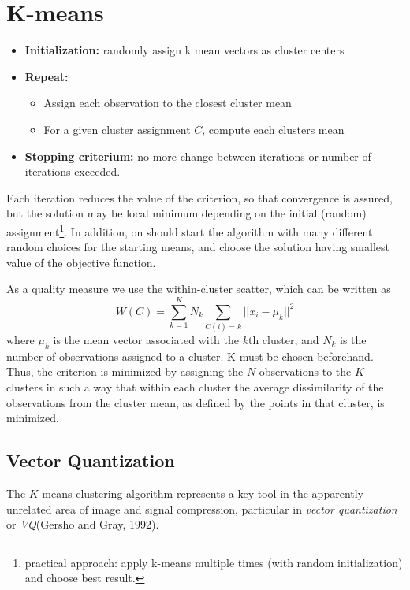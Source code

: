 
\section*{K-means}

\begin{itemize}
	\item \textbf{Initialization:} randomly assign k mean vectors as cluster centers
	\item \textbf{Repeat:}
		\begin{itemize}
			\item Assign each observation to the closest cluster mean
			\item For a given cluster assignment \(C\), compute each clusters mean
		\end{itemize}
	\item \textbf{Stopping criterium:} no more change between iterations or number of iterations exceeded.
\end{itemize}

Each iteration reduces the value of the criterion, so that convergence is assured, but the solution may be local minimum depending on the initial (random) assignment\footnote{practical approach: apply k-means multiple times (with random initialization) and choose best result.}. In addition, on should start the algorithm with many different random choices for the starting means, and choose the solution having smallest value of the objective function.

As a quality measure we use the within-cluster scatter, which can be written as
\begin{equation*}
	W(C) = \sum_{k=1}^K N_k \sum_{C(i) = k} ||x_i - \mu_k||^2
\end{equation*}
where \(\mu_k\) is the mean vector associated with the \(k\)th cluster, and \(N_k\) is the number of observations assigned to a cluster. K must be chosen beforehand. Thus, the criterion is minimized by assigning the \(N\) observations to the \(K\) clusters in such a way that within each cluster the average dissimilarity of the observations from the cluster mean, as defined by the points in that cluster, is minimized.

\subsection*{Vector Quantization}
The \(K\)-means clustering algorithm represents a key tool in the apparently unrelated area of image and signal compression, particular in \textit{vector quantization} or \textit{VQ}(Gersho and Gray, 1992).

